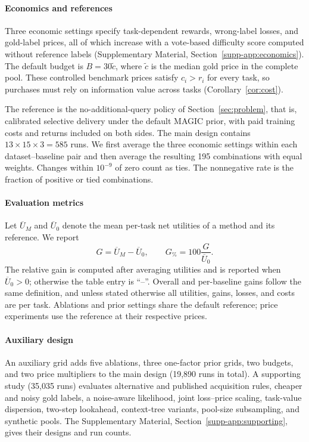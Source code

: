 \documentclass[journal]{IEEEtran}
\begin{document}
\paragraph{Economics and references}
Three economic settings specify task-dependent rewards, wrong-label losses, and gold-label prices, all of which increase with a vote-based difficulty score computed without reference labels (Supplementary Material, Section~\ref{supp-app:economics}). The default budget is $B=30\tilde c$, where $\tilde c$ is the median gold price in the complete pool. These controlled benchmark prices satisfy $c_i>r_i$ for every task, so purchases must rely on information value across tasks (Corollary~\ref{cor:cost}).

The reference is the no-additional-query policy of Section~\ref{sec:problem}, that is, calibrated selective delivery under the default MAGIC prior, with paid training costs and returns included on both sides. The main design contains $13\times15\times3=585$ runs. We first average the three economic settings within each dataset--baseline pair and then average the resulting 195 combinations with equal weights. Changes within $10^{-9}$ of zero count as ties. The nonnegative rate is the fraction of positive or tied combinations.

\paragraph{Evaluation metrics}
Let $\overline U_M$ and $\overline U_0$ denote the mean per-task net utilities of a method and its reference. We report
\begin{equation}
 G=\overline U_M-\overline U_0,\qquad
 G_{\%}=100\frac{G}{\overline U_0}.
 \label{eq:gain_metrics}
\end{equation}
The relative gain is computed after averaging utilities and is reported when $\overline U_0>0$; otherwise the table entry is ``--''. Overall and per-baseline gains follow the same definition, and unless stated otherwise all utilities, gains, losses, and costs are per task. Ablations and prior settings share the default reference; price experiments use the reference at their respective prices.

\paragraph{Auxiliary design}
An auxiliary grid adds five ablations, three one-factor prior grids, two budgets, and two price multipliers to the main design (19,890 runs in total). A supporting study (35,035 runs) evaluates alternative and published acquisition rules, cheaper and noisy gold labels, a noise-aware likelihood, joint loss--price scaling, task-value dispersion, two-step lookahead, context-tree variants, pool-size subsampling, and synthetic pools. The Supplementary Material, Section~\ref{supp-app:supporting}, gives their designs and run counts.
\end{document}

